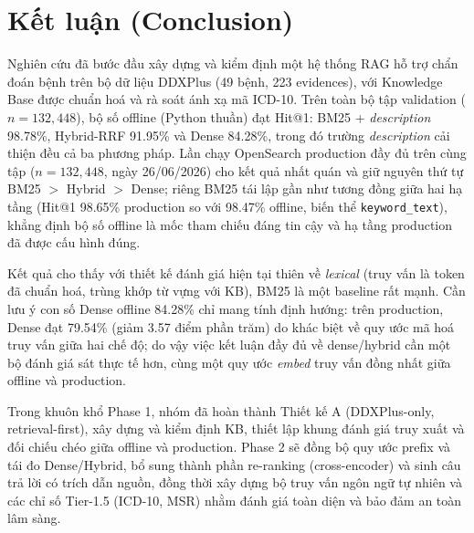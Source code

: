 
\section{Kết luận (Conclusion)}
\label{sec:ketluan}

Nghiên cứu đã bước đầu xây dựng và kiểm định một hệ thống RAG hỗ trợ chẩn đoán bệnh trên bộ dữ liệu DDXPlus (49 bệnh, 223 evidences), với Knowledge Base được chuẩn hoá và rà soát ánh xạ mã ICD-10. Trên toàn bộ tập validation ($n=132{,}448$), bộ số offline (Python thuần) đạt Hit@1: BM25 + \textit{description} 98.78\%, Hybrid-RRF 91.95\% và Dense 84.28\%, trong đó trường \textit{description} cải thiện đều cả ba phương pháp. Lần chạy OpenSearch production đầy đủ trên cùng tập ($n=132{,}448$, ngày 26/06/2026) cho kết quả nhất quán và giữ nguyên thứ tự BM25 $>$ Hybrid $>$ Dense; riêng BM25 tái lập gần như tương đồng giữa hai hạ tầng (Hit@1 98.65\% production so với 98.47\% offline, biến thể \texttt{keyword\_text}), khẳng định bộ số offline là mốc tham chiếu đáng tin cậy và hạ tầng production đã được cấu hình đúng.

Kết quả cho thấy với thiết kế đánh giá hiện tại thiên về \textit{lexical} (truy vấn là token đã chuẩn hoá, trùng khớp từ vựng với KB), BM25 là một baseline rất mạnh. Cần lưu ý con số Dense offline 84.28\% chỉ mang tính định hướng: trên production, Dense đạt 79.54\% (giảm 3.57 điểm phần trăm) do khác biệt về quy ước mã hoá truy vấn giữa hai chế độ; do vậy việc kết luận đầy đủ về dense/hybrid cần một bộ đánh giá sát thực tế hơn, cùng một quy ước \textit{embed} truy vấn đồng nhất giữa offline và production.

Trong khuôn khổ Phase 1, nhóm đã hoàn thành Thiết kế A (DDXPlus-only, retrieval-first), xây dựng và kiểm định KB, thiết lập khung đánh giá truy xuất và đối chiếu chéo giữa offline và production. Phase 2 sẽ đồng bộ quy ước prefix và tái đo Dense/Hybrid, bổ sung thành phần re-ranking (cross-encoder) và sinh câu trả lời có trích dẫn nguồn, đồng thời xây dựng bộ truy vấn ngôn ngữ tự nhiên và các chỉ số Tier-1.5 (ICD-10, MSR) nhằm đánh giá toàn diện và bảo đảm an toàn lâm sàng.
